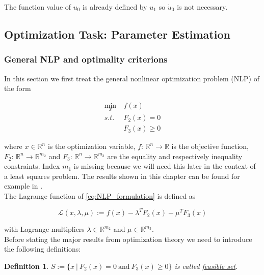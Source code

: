 \documentclass{scrartcl}[12pt, halfparskip]
\numberwithin{equation}{section}
\numberwithin{figure}{section}
\numberwithin{table}{section}
\newtheorem{Definition}{Definition}
\begin{document}
The function value of $u_0$ is already defined by $u_1$ so $\dot{u}_0$ is not necessary.




\subsection{Optimization Task: Parameter Estimation}


\subsubsection{General NLP and optimality criterions}
In this section we first treat the general nonlinear optimization problem (NLP) of the form

\begin{align}
	\min_x & \ f(x) \label{eq:NLP_formulation} \\
	s.t. & \ F_2(x) = 0 \nonumber \\
	& \ F_3(x) \ge 0 \nonumber
\end{align}

where $x \in \mathbb{R}^n$ is the optimization variable, $f\text{: } \mathbb{R}^n \rightarrow \mathbb{R}$ is the objective function, $F_2\text{: } \mathbb{R}^n \rightarrow \mathbb{R}^{m_2}$ and $F_3\text{: } \mathbb{R}^n \rightarrow \mathbb{R}^{m_3}$ are the equality and respectively inequality constraints. Index $m_1$ is missing because we will need this later in the context of a least squares problem. The results shown in this chapter can be found for example in \cite{nonlinear_optimiziation_wright}. \\

The Lagrange function of \eqref{eq:NLP_formulation} is defined as

\begin{equation}
	\mathcal{L}(x,\lambda,\mu) := f(x) - \lambda^T F_2(x) - \mu^T F_3(x)
\end{equation}

with Lagrange multipliers $\lambda \in \mathbb{R}^{m_2}$ and $\mu \in \mathbb{R}^{m_3}$. \\

Before stating the major results from optimization theory we need to introduce the following definitions:

\begin{Definition}
	$S := \{ x \ | \ F_2(x) = 0 \ \text{and} \ F_3(x) \ge 0 \}$ is called \underline{feasible set}.
\end{Definition}
\end{document}
